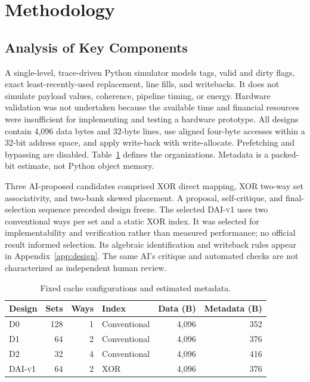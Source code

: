 \documentclass[11pt,a4paper]{article}
\newcommand{\dai}{\textsc{DAI-v1}}
\begin{document}
\section{Methodology}
\subsection{Analysis of Key Components}
A single-level, trace-driven Python simulator models tags, valid and dirty flags, exact least-recently-used replacement, line fills, and writebacks. It does not simulate payload values, coherence, pipeline timing, or energy. Hardware validation was not undertaken because the available time and financial resources were insufficient for implementing and testing a hardware prototype. All designs contain 4,096 data bytes and 32-byte lines, use aligned four-byte accesses within a 32-bit address space, and apply write-back with write-allocate. Prefetching and bypassing are disabled. Table~\ref{tab:configs} defines the organizations. Metadata is a packed-bit estimate, not Python object memory.

Three AI-proposed candidates comprised XOR direct mapping, XOR two-way set associativity, and two-bank skewed placement. A proposal, self-critique, and final-selection sequence preceded design freeze. The selected \dai{} uses two conventional ways per set and a static XOR index. It was selected for implementability and verification rather than measured performance; no official result informed selection. Its algebraic identification and writeback rules appear in Appendix~\ref{app:design}. The same AI's critique and automated checks are not characterized as independent human review.

\begin{table}[htbp]\centering\small
\caption{Fixed cache configurations and estimated metadata.}\label{tab:configs}
\begin{tabular}{lrrlrr}\toprule
Design & Sets & Ways & Index & Data (B) & Metadata (B)\\\midrule
D0 & 128 & 1 & Conventional & 4,096 & 352\\
D1 & 64 & 2 & Conventional & 4,096 & 376\\
D2 & 32 & 4 & Conventional & 4,096 & 416\\
\dai{} & 64 & 2 & XOR & 4,096 & 376\\\bottomrule
\end{tabular}
\end{table}
\end{document}
